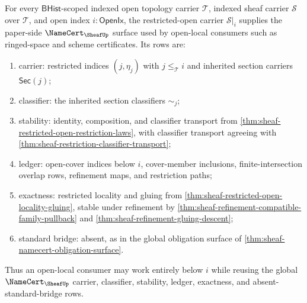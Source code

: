 \begin{theorem}
\label{thm:sheaf-restricted-open-namecert-surface}
For every $\mathsf{BHist}$-scoped indexed open topology carrier $\mathcal{T}$, indexed sheaf carrier $\mathcal{S}$ over $\mathcal{T}$, and open index $i:\mathsf{OpenIx}$, the restricted-open carrier $\mathcal{S}|_i$ supplies the paper-side $\NameCert_{\SheafUp}$ surface used by open-local consumers such as ringed-space and scheme certificates. Its rows are:
\begin{enumerate}
\item carrier: restricted indices $(j,\eta_j)$ with $j\le_{\mathcal{T}}i$ and inherited section carriers $\mathsf{Sec}(j)$;
\item classifier: the inherited section classifiers $\sim_j$;
\item stability: identity, composition, and classifier transport from \autoref{thm:sheaf-restricted-open-restriction-laws}, with classifier transport agreeing with \autoref{thm:sheaf-restriction-classifier-transport};
\item ledger: open-cover indices below $i$, cover-member inclusions, finite-intersection overlap rows, refinement maps, and restriction paths;
\item exactness: restricted locality and gluing from \autoref{thm:sheaf-restricted-open-locality-gluing}, stable under refinement by \autoref{thm:sheaf-refinement-compatible-family-pullback} and \autoref{thm:sheaf-refinement-gluing-descent};
\item standard bridge: absent, as in the global obligation surface of \autoref{thm:sheaf-namecert-obligation-surface}.
\end{enumerate}
Thus an open-local consumer may work entirely below $i$ while reusing the global $\NameCert_{\SheafUp}$ carrier, classifier, stability, ledger, exactness, and absent-standard-bridge rows.
\end{theorem}
